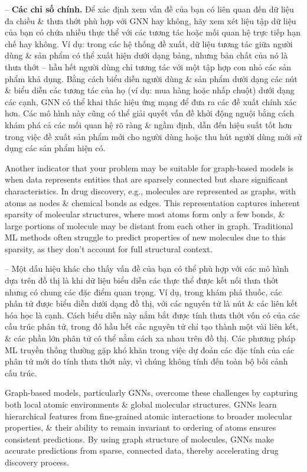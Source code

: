 \documentclass{article}
\begin{document}
\begin{itemize}
\begin{itemize}
\begin{itemize}
            -- {\bf Các chỉ số chính.} Để xác định xem vấn đề của bạn có liên quan đến dữ liệu đa chiều \& thưa thớt phù hợp với GNN hay không, hãy xem xét liệu tập dữ liệu của bạn có chứa nhiều thực thể với các tương tác hoặc mối quan hệ trực tiếp hạn chế hay không. Ví dụ: trong các hệ thống đề xuất, dữ liệu tương tác giữa người dùng \& sản phẩm có thể xuất hiện dưới dạng bảng, nhưng bản chất của nó là thưa thớt -- hầu hết người dùng chỉ tương tác với một tập hợp con nhỏ các sản phẩm khả dụng. Bằng cách biểu diễn người dùng \& sản phẩm dưới dạng các nút \& biểu diễn các tương tác của họ (ví dụ: mua hàng hoặc nhấp chuột) dưới dạng các cạnh, GNN có thể khai thác hiệu ứng mạng để đưa ra các đề xuất chính xác hơn. Các mô hình này cũng có thể giải quyết vấn đề khởi động nguội bằng cách khám phá cả các mối quan hệ rõ ràng \& ngầm định, dẫn đến hiệu suất tốt hơn trong việc đề xuất sản phẩm mới cho người dùng hoặc thu hút người dùng mới sử dụng các sản phẩm hiện có.

            Another indicator that your problem may be suitable for graph-based models is when data represents entities that are sparsely connected but share significant characteristics. In drug discovery, e.g., molecules are represented as graphs, with atoms as nodes \& chemical bonds as edges. This representation captures inherent sparsity of molecular structures, where most atoms form only a few bonds, \& large portions of molecule may be distant from each other in graph. Traditional ML methods often struggle to predict properties of new molecules due to this sparsity, as they don't account for full structural context.

            -- Một dấu hiệu khác cho thấy vấn đề của bạn có thể phù hợp với các mô hình dựa trên đồ thị là khi dữ liệu biểu diễn các thực thể được kết nối thưa thớt nhưng có chung các đặc điểm quan trọng. Ví dụ, trong khám phá thuốc, các phân tử được biểu diễn dưới dạng đồ thị, với các nguyên tử là nút \& các liên kết hóa học là cạnh. Cách biểu diễn này nắm bắt được tính thưa thớt vốn có của các cấu trúc phân tử, trong đó hầu hết các nguyên tử chỉ tạo thành một vài liên kết, \& các phần lớn phân tử có thể nằm cách xa nhau trên đồ thị. Các phương pháp ML truyền thống thường gặp khó khăn trong việc dự đoán các đặc tính của các phân tử mới do tính thưa thớt này, vì chúng không tính đến toàn bộ bối cảnh cấu trúc.

            Graph-based models, particularly GNNs, overcome these challenges by capturing both local atomic environments \& global molecular structures. GNNs learn hierarchical features from fine-grained atomic interactions to broader molecular properties, \& their ability to remain invariant to ordering of atoms ensures consistent predictions. By using graph structure of molecules, GNNs make accurate predictions from sparse, connected data, thereby accelerating drug discovery process.


\end{itemize}
\end{itemize}
\end{itemize}
\end{document}
